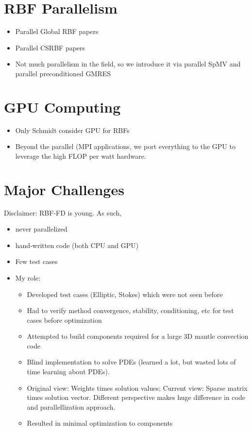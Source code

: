 \section{RBF Parallelism}
\begin{itemize} 
	\item Parallel Global RBF papers
	\item Parallel CSRBF papers
	\item Not much parallelism in the field, so we introduce it via parallel SpMV and parallel preconditioned GMRES
\end{itemize} 

\section{GPU Computing} 
\begin{itemize} 
	\item Only Schmidt consider GPU for RBFs
	\item Beyond the parallel (MPI applications, we port everything to the GPU to leverage the high FLOP per watt hardware. 
\end{itemize} 

\section{Major Challenges}
Disclaimer: RBF-FD is young. As such, 
\begin{itemize}
	\item never parallelized
	\item hand-written code (both CPU and GPU)
	\item Few test cases
	\item My role:
	\begin{itemize} 
	\item Developed test cases (Elliptic, Stokes) which were not seen before
	\item Had to verify method convergence, stability, conditioning, etc for test cases before optimization
	\item Attempted to build components required for a large 3D mantle convection code
	\item Blind implementation to solve PDEs (learned a lot, but wasted lots of time learning about PDEs). 
	\item Original view: Weights times solution values; Current view: Sparse matrix times solution vector. Different perspective makes huge difference in code and parallellization approach.
	\item Resulted in minimal optimization to components
	\end{itemize} 
\end{itemize} 



